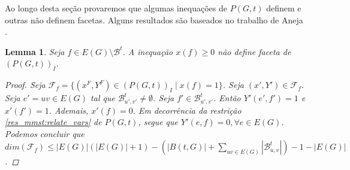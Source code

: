 \documentclass[11pt,reqno]{amsart}
\newcommand{\spanBridge}{\mathcal{B}}
\newcommand{\BridgeuvPrime}{\spanBridge_{u',v'}^{t}}
\newcommand{\Bridgeuv}{\spanBridge_{u,v}^{t}}
\newcommand{\Bridge}{\spanBridge^{t}}
\newtheorem{lema}{Lemma}
\newcommand{\incid}{\mathcal{X}}
\newcommand{\incidY}{\mathcal{Y}}
\newcommand{\facetF}{\mathcal{F}}
\begin{document}
Ao longo desta seção provaremos que algumas inequações de $P(G,t)$ definem 
e outras não definem 
facetas. Alguns resultados são baseados no trabalho de Aneja \cite{Aneja1980}.

\begin{lema}
\label{lem:x_not_facet}
Seja $f \in E(G) \setminus \Bridge$. A inequação $x(f) \ge 0$ 
não define faceta de $(P(G,t))_I$.
\begin{proof}
Seja $\facetF_f = \{(x^{F},Y^{F}) \in (P(G,t))_I\; |\; x(f) = 1\}$. Seja 
$(x',Y') \in \facetF_f$. 
Seja $e'=uv \in E(G)$ tal que $\BridgeuvPrime \neq \emptyset$. Seja 
$f'\in \BridgeuvPrime$. Então $Y'(e',f') = 1$ e $x'(f') = 1$. 
Ademais, $x'(f) = 0$. Em decorrência da restrição 
\ref{res_mmst:relate_vars} de $P(G,t)$, segue que 
$Y'(e,f) = 0, \forall e \in E(G)$. Podemos concluir que \\
\mbox{$dim(\facetF_f) \le |E(G)|(|E(G)|+1) - (|B(t,G)|+\sum_{uv \in E(G)}|\Bridgeuv|) - 1 - |E(G)|$.}
\end{proof}
\end{lema}


\end{document}
